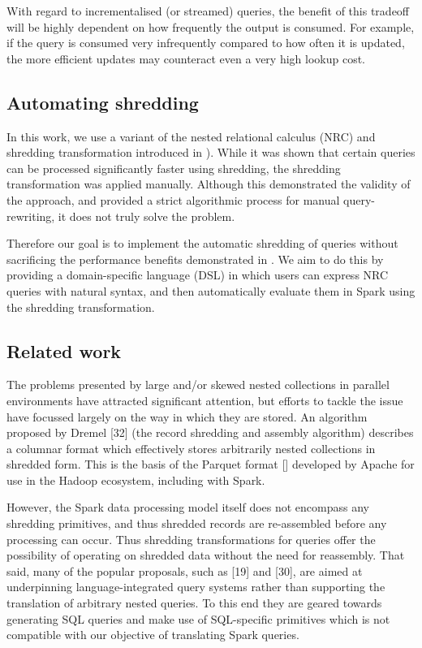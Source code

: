 {With regard to incrementalised (or streamed) queries, the benefit of this tradeoff will be highly dependent on how frequently the output is consumed. For example, if the query is consumed very infrequently compared to how often it is updated, the more efficient updates may counteract even a very high lookup cost.

\subsection{Automating shredding} {
In this work, we use a variant of the nested relational calculus (NRC) and shredding transformation introduced in \cite{draftpaper}). While it was shown that certain queries can be processed significantly faster using shredding, the shredding transformation was applied manually. Although this demonstrated the validity of the approach, and provided a strict algorithmic process for manual query-rewriting, it does not truly solve the problem.

Therefore our goal is to implement the automatic shredding of queries without sacrificing the performance benefits demonstrated in \cite{draftpaper}. We aim to do this by providing a domain-specific language (DSL) in which users can express NRC queries with natural syntax, and then automatically evaluate them in Spark using the shredding transformation.
}

\subsection{Related work} {
The problems presented by large and/or skewed nested collections in parallel environments have attracted significant attention, but efforts to tackle the issue have focussed largely on the way in which they are stored. An algorithm proposed by Dremel [32] (the record shredding and assembly algorithm) describes a columnar format which effectively stores arbitrarily nested collections in shredded form. This is the basis of the Parquet format [] developed by Apache for use in the Hadoop ecosystem, including with Spark.

However, the Spark data processing model itself does not encompass any shredding primitives, and thus shredded records are re-assembled before any processing can occur. Thus shredding transformations for queries offer the possibility of operating on shredded data without the need for reassembly. That said, many of the popular proposals, such as [19] and [30], are aimed at underpinning language-integrated query systems rather than supporting the translation of arbitrary nested queries. To this end they are geared towards generating SQL queries and make use of SQL-specific primitives which is not compatible with our objective of translating Spark queries.

}}
